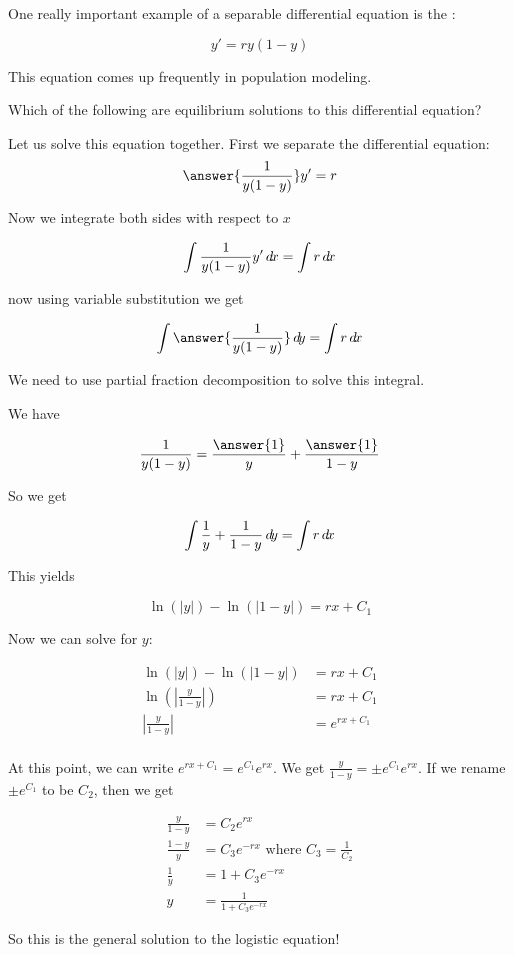 \documentclass{ximera}
\begin{document}
\begin{example}	
One really important example of a separable differential equation is the :

\[
y' = ry(1-y)
\]

This equation comes up frequently in population modeling.  

\begin{question}
	Which of the following are equilibrium solutions to this differential equation?
	
\begin{multipleChoice}
\end{multipleChoice}
\end{question}

Let us solve this equation together.  First we separate the differential equation:
\[
\answer{\frac{1}{y(1-y)}} y'  = r
\]

Now we integrate both sides with respect to $x$

\[
\int \frac{1}{y(1-y)} y' \mathop{}\!d\! x =\int r \mathop{}\!d\! x
\]

now using variable substitution we get

\[
\int \answer{\frac{1}{y(1-y)}} \d y = \int r \d x
\]

We need to use partial fraction decomposition to solve this integral.

We have

\[
\frac{1}{y(1-y)} = \frac{\answer{1}}{y}+\frac{\answer{1}}{1-y}
\]

So we get

\[
\int \frac{1}{y} + \frac{1}{1-y} \mathop{}\!d\! y = \int r \mathop{}\!d\! x
\]

This yields

\[
\ln(|y|) -  \ln(|1-y|)  = rx+C_1
\]


Now we can solve for $y$:

\begin{align*}
\ln(|y|) -  \ln(|1-y|)  &= rx+C_1\\
\ln(|\frac{y}{1-y}|) &= rx+C_1\\
|\frac{y}{1-y}| &= e^{rx+C_1}\\
\end{align*}

At this point, we can write $e^{rx+C_1} = e^{C_1} e^{rx}$.  We get $\frac{y}{1-y} = \pm e^{C_1} e^{rx}$.  If we rename $\pm e^{C_1}$ to be $C_2$, then we get

\begin{align*}
\frac{y}{1-y} &=  C_2e^{rx}\\
\frac{1-y}{y} &= C_3e^{-rx} \textrm{ where $C_3  =\frac{1}{C_2}$}\\
\frac{1}{y} &= 1+C_3e^{-rx}\\
y &= \frac{1}{1+C_3e^{-rx}}
\end{align*}


So this is the general solution to the logistic equation!
\end{example}
\end{document}
